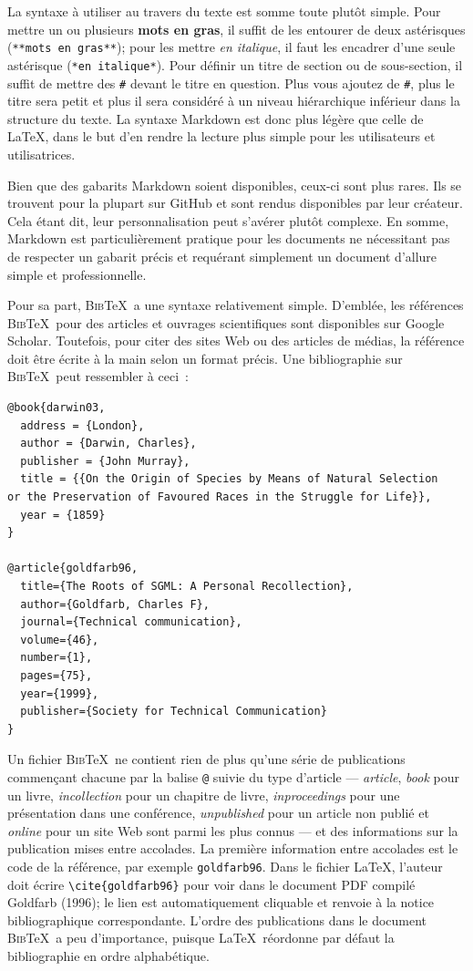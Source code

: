 \documentclass[
  letterpaper,
]{scrbook}
\begin{document}
La syntaxe à utiliser au travers du texte est somme toute plutôt simple.
Pour mettre un ou plusieurs \textbf{mots en gras}, il suffit de les
entourer de deux astérisques (\texttt{**mots\ en\ gras**}); pour les
mettre \emph{en italique}, il faut les encadrer d'une seule astérisque
(\texttt{*en\ italique*}). Pour définir un titre de section ou de
sous-section, il suffit de mettre des \texttt{\#} devant le titre en
question. Plus vous ajoutez de \texttt{\#}, plus le titre sera petit et
plus il sera considéré à un niveau hiérarchique inférieur dans la
structure du texte. La syntaxe Markdown est donc plus légère que celle
de \LaTeX, dans le but d'en rendre la lecture plus simple pour les
utilisateurs et utilisatrices.

Bien que des gabarits Markdown soient disponibles, ceux-ci sont plus
rares. Ils se trouvent pour la plupart sur GitHub et sont rendus
disponibles par leur créateur. Cela étant dit, leur personnalisation
peut s'avérer plutôt complexe. En somme, Markdown est particulièrement
pratique pour les documents ne nécessitant pas de respecter un gabarit
précis et requérant simplement un document d'allure simple et
professionnelle.

Pour sa part, \textsc{Bib}\TeX~a une syntaxe relativement simple.
D'emblée, les références \textsc{Bib}\TeX~pour des articles et ouvrages
scientifiques sont disponibles sur Google Scholar. Toutefois, pour citer
des sites Web ou des articles de médias, la référence doit être écrite à
la main selon un format précis. Une bibliographie sur
\textsc{Bib}\TeX~peut ressembler à ceci~:

\begin{verbatim}
@book{darwin03,
  address = {London},
  author = {Darwin, Charles},
  publisher = {John Murray},
  title = {{On the Origin of Species by Means of Natural Selection
or the Preservation of Favoured Races in the Struggle for Life}},
  year = {1859}
}

@article{goldfarb96,
  title={The Roots of SGML: A Personal Recollection},
  author={Goldfarb, Charles F},
  journal={Technical communication},
  volume={46},
  number={1},
  pages={75},
  year={1999},
  publisher={Society for Technical Communication}
}
\end{verbatim}

Un fichier \textsc{Bib}\TeX~ne contient rien de plus qu'une série de
publications commençant chacune par la balise \texttt{@} suivie du type
d'article --- \emph{article}, \emph{book} pour un livre,
\emph{incollection} pour un chapitre de livre, \emph{inproceedings} pour
une présentation dans une conférence, \emph{unpublished} pour un article
non publié et \emph{online} pour un site Web sont parmi les plus connus
--- et des informations sur la publication mises entre accolades. La
première information entre accolades est le code de la référence, par
exemple \texttt{goldfarb96}. Dans le fichier \LaTeX, l'auteur doit
écrire \texttt{\textbackslash{}cite\{goldfarb96\}} pour voir dans le
document PDF compilé Goldfarb (1996); le lien est automatiquement
cliquable et renvoie à la notice bibliographique correspondante. L'ordre
des publications dans le document \textsc{Bib}\TeX~a peu d'importance,
puisque \LaTeX~réordonne par défaut la bibliographie en ordre
alphabétique.
\end{document}
